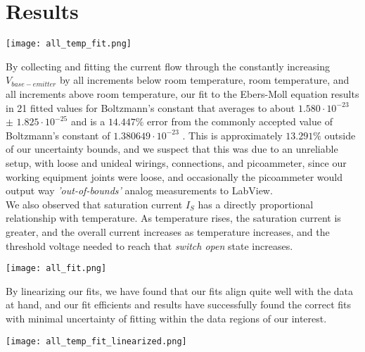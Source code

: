 \documentclass[10pt,letterpaper,onecolumn]{article}
\begin{document}

\section{Results}

\begin{center}
 \texttt{[image: all\_temp\_fit.png]}
 \label{fig:all_temp_fitted}
\end{center}

By collecting and fitting the current flow through the constantly increasing $V_{base-emitter}$ by all increments below room temperature, room temperature, and all increments above room temperature, our fit to the Ebers-Moll equation results in 21 fitted values for Boltzmann's constant that averages to about $1.580\cdot 10^{-23}$ $\pm$ $1.825\cdot 10^{-25}$ and is a $14.447\%$ error from the commonly accepted value of Boltzmann's constant of $1.380649\cdot 10^{-23}$ \cite{k}. This is approximately $13.291\%$ outside of our uncertainty bounds, and we suspect that this was due to an unreliable setup, with loose and unideal wirings, connections, and picoammeter, since our working equipment joints were loose, and occasionally the picoammeter would output way {\it 'out-of-bounds'} analog measurements to LabView.\\

We also observed that saturation current $I_S$ has a directly proportional relationship with temperature. As temperature rises, the saturation current is greater, and the overall current increases as temperature increases, and the threshold voltage needed to reach that {\it switch open} state increases.


\begin{center}
 \texttt{[image: all\_fit.png]}
 \label{fig:all_fit}
\end{center}

By linearizing our fits, we have found that our fits align quite well with the data at hand, and our fit efficients and results have successfully found the correct fits with minimal uncertainty of fitting within the data regions of our interest.


\begin{center}
 \texttt{[image: all\_temp\_fit\_linearized.png]}
 \label{fig:all_fit}
\end{center}
\end{document}
